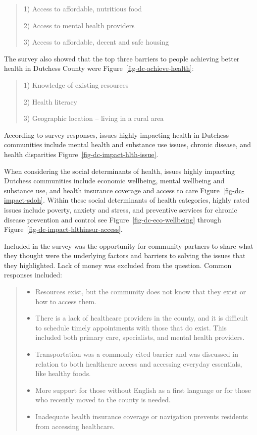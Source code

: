 \documentclass[
  english,
  letterpaper,
]{report}
\begin{document}
\begin{quote}
1) Access to affordable, nutritious food

2) Access to mental health providers

3) Access to affordable, decent and safe housing
\end{quote}

The survey also showed that the top three barriers to people achieving
better health in Dutchess County were
Figure~\ref{fig-dc-achieve-health}:

\begin{quote}
1) Knowledge of existing resources

2) Health literacy

3) Geographic location -- living in a rural area
\end{quote}

According to survey responses, issues highly impacting health in
Dutchess communities include mental health and substance use issues,
chronic disease, and health disparities
Figure~\ref{fig-dc-impact-hlth-issue}.

When considering the social determinants of health, issues highly
impacting Dutchess communities include economic wellbeing, mental
wellbeing and substance use, and health insurance coverage and access to
care Figure~\ref{fig-dc-impact-sdoh}. Within these social determinants
of health categories, highly rated issues include poverty, anxiety and
stress, and preventive services for chronic disease prevention and
control see Figure~\ref{fig-dc-eco-wellbeing} through
Figure~\ref{fig-dc-impact-hlthinsur-access}.

Included in the survey was the opportunity for community partners to
share what they thought were the underlying factors and barriers to
solving the issues that they highlighted. Lack of money was excluded
from the question. Common responses included:

\begin{quote}
\begin{itemize}
\item
  Resources exist, but the community does not know that they exist or
  how to access them.
\item
  There is a lack of healthcare providers in the county, and it is
  difficult to schedule timely appointments with those that do exist.
  This included both primary care, specialists, and mental health
  providers.
\item
  Transportation was a commonly cited barrier and was discussed in
  relation to both healthcare access and accessing everyday essentials,
  like healthy foods.
\item
  More support for those without English as a first language or for
  those who recently moved to the county is needed.
\item
  Inadequate health insurance coverage or navigation prevents residents
  from accessing healthcare.
\end{itemize}
\end{quote}
\end{document}
